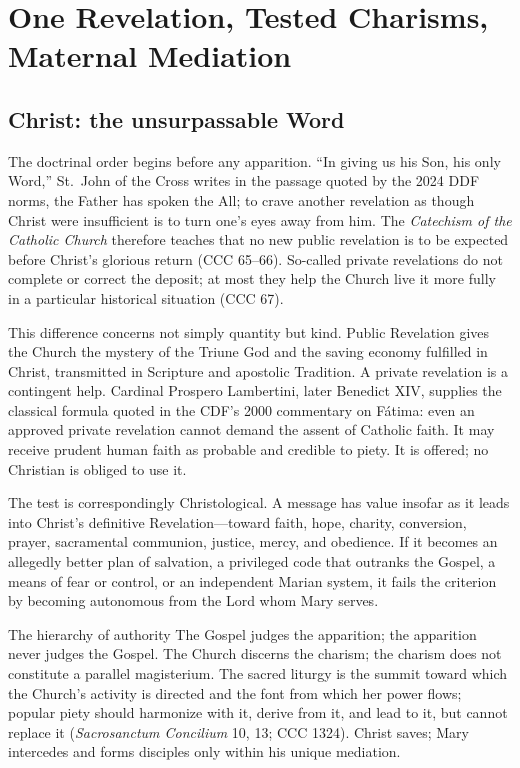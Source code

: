 \section{One Revelation, Tested Charisms, Maternal Mediation}

\subsection{Christ: the unsurpassable Word}

The doctrinal order begins before any apparition. ``In giving us his Son, his only Word,'' St.~John of the Cross writes in the passage quoted by the 2024 DDF norms, the Father has spoken the All; to crave another revelation as though Christ were insufficient is to turn one's eyes away from him. The \emph{Catechism of the Catholic Church} therefore teaches that no new public revelation is to be expected before Christ's glorious return (CCC 65--66). So-called private revelations do not complete or correct the deposit; at most they help the Church live it more fully in a particular historical situation (CCC 67).

This difference concerns not simply quantity but kind. Public Revelation gives the Church the mystery of the Triune God and the saving economy fulfilled in Christ, transmitted in Scripture and apostolic Tradition. A private revelation is a contingent help. Cardinal Prospero Lambertini, later Benedict XIV, supplies the classical formula quoted in the CDF's 2000 commentary on Fátima: even an approved private revelation cannot demand the assent of Catholic faith. It may receive prudent human faith as probable and credible to piety. It is offered; no Christian is obliged to use it.

The test is correspondingly Christological. A message has value insofar as it leads into Christ's definitive Revelation---toward faith, hope, charity, conversion, prayer, sacramental communion, justice, mercy, and obedience. If it becomes an allegedly better plan of salvation, a privileged code that outranks the Gospel, a means of fear or control, or an independent Marian system, it fails the criterion by becoming autonomous from the Lord whom Mary serves.

\begin{massbox}{The hierarchy of authority}
The Gospel judges the apparition; the apparition never judges the Gospel. The Church discerns the charism; the charism does not constitute a parallel magisterium. The sacred liturgy is the summit toward which the Church's activity is directed and the font from which her power flows; popular piety should harmonize with it, derive from it, and lead to it, but cannot replace it (\emph{Sacrosanctum Concilium} 10, 13; CCC 1324). Christ saves; Mary intercedes and forms disciples only within his unique mediation.
\end{massbox}

